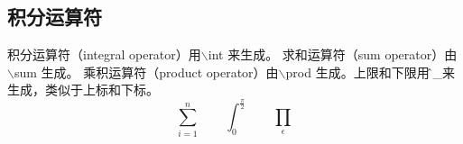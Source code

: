 \documentclass{ctexart}
\begin{document}
\subsection{积分运算符}
积分运算符（integral operator）用$\backslash$int 来生成。
求和运算符（sum operator）由$\backslash$sum 生成。
乘积运算符（product operator）由$\backslash$prod 生成。上限和下限用\^ 和\_来生成，类似于上标和下标。\\
\begin{displaymath}
\sum_{i=1}^{n} \qquad
\int_{0}^{\frac{\pi}{2}} \qquad
\prod_{\epsilon}
\end{displaymath}
\end{document}
